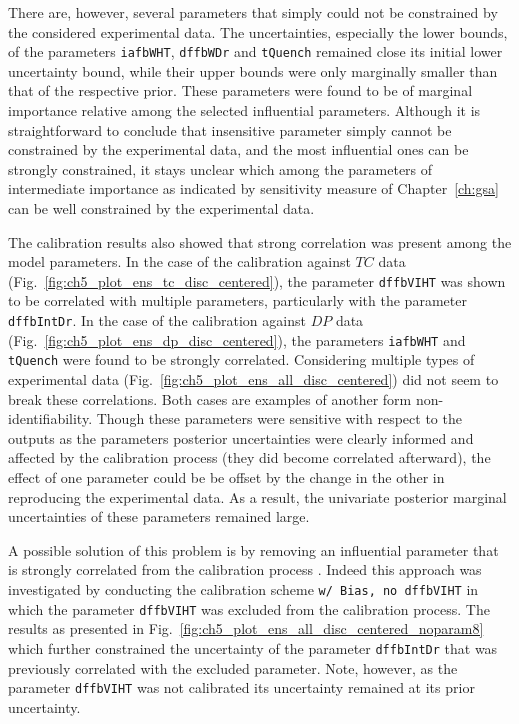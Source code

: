 There are, however, several parameters that simply could not be constrained by the considered experimental data.
The uncertainties, especially the lower bounds, of the parameters \texttt{iafbWHT}, \texttt{dffbWDr} and \texttt{tQuench} remained close its initial lower uncertainty bound,
while their upper bounds were only marginally smaller than that of the respective prior. 
These parameters were found to be of marginal importance relative among the selected influential parameters.
Although it is straightforward to conclude that insensitive parameter simply cannot be constrained by the experimental data, and the most influential ones can be strongly constrained, it stays unclear which among the parameters of intermediate importance as indicated by sensitivity measure of Chapter~\ref{ch:gsa} can be well constrained by the experimental data.

The calibration results also showed that strong correlation was pres\-ent among the model parameters.
In the case of the calibration against $TC$ data (Fig.~\ref{fig:ch5_plot_ens_tc_disc_centered}), the parameter \texttt{dffbVIHT} was shown to be correlated with multiple parameters, particularly with the parameter \texttt{dffbIntDr}.
In the case of the calibration against $DP$ data (Fig.~\ref{fig:ch5_plot_ens_dp_disc_centered}), the parameters \texttt{iafbWHT} and \texttt{tQuench} were found to be strongly correlated. 
Considering multiple types of experimental data (Fig.~\ref{fig:ch5_plot_ens_all_disc_centered}) did not seem to break these correlations.
Both cases are examples of another form non-identifiability.
Though these parameters were sensitive with respect to the outputs as the parameters posterior uncertainties were clearly informed and affected by the calibration process (they did become correlated afterward), 
the effect of one parameter could be be offset by the change in the other in reproducing the experimental data. 
As a result, the univariate posterior marginal uncertainties of these parameters remained large.

A possible solution of this problem is by removing an influential parameter that is strongly correlated from the calibration process \cite{Brun2002}.
Indeed this approach was investigated by conducting the calibration scheme \texttt{w/ Bias, no dffbVIHT} in which the parameter \texttt{dffbVIHT} was excluded from the calibration process.
The results as presented in Fig.~\ref{fig:ch5_plot_ens_all_disc_centered_noparam8} which further constrained the uncertainty of the parameter \texttt{dffbIntDr} that was previously correlated with the excluded parameter.
Note, however, as the parameter \texttt{dffbVIHT} was not calibrated its uncertainty remained at its prior uncertainty.

